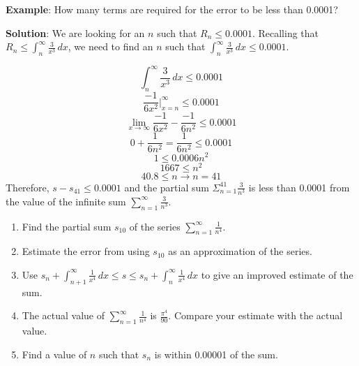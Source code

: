 \textbf{Example}: How many terms are required for the error to be less than 
0.0001?

\textbf{Solution}: We are looking for an $n$ such that $R_n \leq 0.0001$. 
Recalling that $R_n \leq \int_{n}^\infty \frac{3}{x^3}\,dx$, we need to find 
an $n$ such that $\int_{n}^\infty \frac{3}{x^3}\,dx \leq 0.0001$. 

$$\int_n^\infty \frac{3}{x^3}\,dx \leq 0.0001$$
$$\frac{-1}{6x^2}|_{x=n}^\infty \leq 0.0001$$
$$\lim_{x \to \infty} \frac{-1}{6x^2} - \frac{-1}{6n^2} \leq 0.0001$$
$$0 + \frac{1}{6n^2} = \frac{1}{6n^2} \leq 0.0001$$
$$1 \leq 0.0006n^2$$
$$1667 \leq n^2$$
$$40.8 \leq n \rightarrow n = 41$$
Therefore, $s - s_{41} \leq 0.0001$ and the partial sum $\Sigma_{n=1}^{41} 
\frac{3}{n^3}$ is less than 0.0001 from the value of the infinite sum $\sum_
{n=1}^\infty \frac{3}{n^3}$.

\begin{Exercise}[label=remainder1]
\begin{enumerate}
\item Find the partial sum $s_{10}$ of the series $\sum_{n=1}^\infty 
\frac{1}{n^4}$. 
\item Estimate the error from using $s_{10}$ as an approximation of the series.
\item Use $s_n + \int_{n+1}^\infty \frac{1}{x^4}\,dx \leq s \leq s_n + \int_n^
\infty \frac{1}{x^4}\,dx$ to give an improved estimate of the sum.
\item The actual value of $\sum_{n=1}^\infty \frac{1}{n^4}$ is 
$\frac{\pi^4}{90}$. Compare your estimate with the actual value.
\item Find a value of $n$ such that $s_n$ is within 0.00001 of the sum. 
\end{enumerate}
\vspace{50mm}
\end{Exercise}

